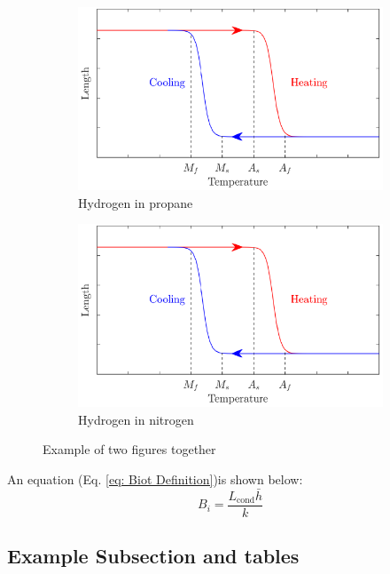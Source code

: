 \begin{figure}
\centering
\begin{subfigure}{.49\textwidth}
  \centering
  \includegraphics[width=1\linewidth]{figures/fig_2.pdf}
  \caption{Hydrogen in propane}
  \label{fig:sub1}
\end{subfigure}
\begin{subfigure}{.49\textwidth}
  \centering
  \includegraphics[width=1\linewidth]{figures/fig_2.pdf}
  \caption{Hydrogen in nitrogen}
  \label{fig:sub2}
\end{subfigure}
\caption{Example of two figures together}
\label{FIG: Two figs}
\end{figure}



An equation (Eq. \ref{eq: Biot Definition})is shown below:
\begin{equation}
B_i = \frac{L_{\text{cond}}\bar{h}}{k}
\label{eq: Biot Definition}
\end{equation}

\subsection{Example Subsection and tables}

